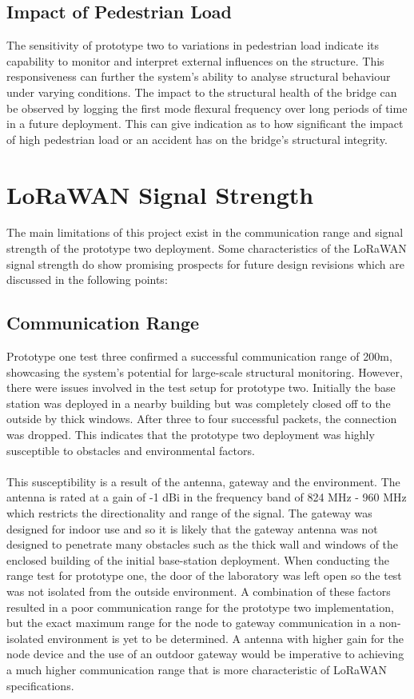 \subsection{Impact of Pedestrian Load}
The sensitivity of prototype two to variations in pedestrian load indicate its capability to monitor and interpret external influences on the structure. This responsiveness can further the system's ability to analyse structural behaviour under varying conditions. The impact to the structural health of the bridge can be observed by logging the first mode flexural frequency over long periods of time in a future deployment. This can give indication as to how significant the impact of high pedestrian load or an accident has on the bridge's structural integrity. 

\section{LoRaWAN Signal Strength}
The main limitations of this project exist in the communication range and signal strength of the prototype two deployment. Some characteristics of the LoRaWAN signal strength do show promising prospects for future design revisions which are discussed in the following points:

\subsection{Communication Range}
Prototype one test three confirmed a successful communication range of 200m, showcasing the system's potential for large-scale structural monitoring. However, there were issues involved in the test setup for prototype two. Initially the base station was deployed in a nearby building but was completely closed off to the outside by thick windows. After three to four successful packets, the connection was dropped. This indicates that the prototype two deployment was highly susceptible to obstacles and environmental factors.\\\\
This susceptibility is a result of the antenna, gateway and the environment. The antenna is rated at a gain of -1 dBi in the frequency band of 824 MHz - 960 MHz which restricts the directionality and range of the signal. The gateway was designed for indoor use and so it is likely that the gateway antenna was not designed to penetrate many obstacles such as the thick wall and windows of the enclosed building of the initial base-station deployment. When conducting the range test for prototype one, the door of the laboratory was left open so the test was not isolated from the outside environment. A combination of these factors resulted in a poor communication range for the prototype two implementation, but the exact maximum range for the node to gateway communication in a non-isolated environment is yet to be determined. A antenna with higher gain for the node device and the use of an outdoor gateway would be imperative to achieving a much higher communication range that is more characteristic of LoRaWAN specifications. 
